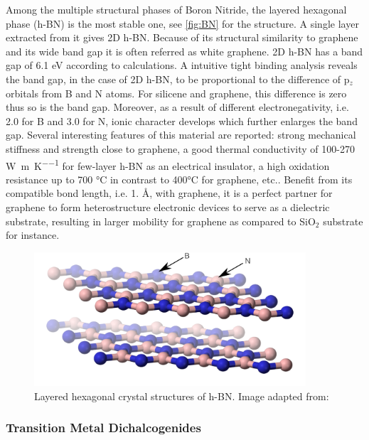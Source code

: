 Among the multiple structural phases of Boron Nitride, the layered hexagonal phase (h-BN) is the most stable one, see \autoref{fig:BN} for the structure. A single layer extracted from it gives 2D h-BN. Because of its structural similarity to graphene and its wide band gap it is often referred as white graphene\cite{alem2009atomically}. 2D h-BN has a band gap of 6.1 eV according to calculations. A intuitive tight binding analysis reveals the band gap, in the case of 2D h-BN, to be proportional to the difference of p$_z$ orbitals from B and N atoms. For silicene and graphene, this difference is zero thus so is the band gap. Moreover, as a result of different electronegativity, i.e. 2.0 for B and 3.0 for N, ionic character develops which further enlarges the band gap\cite{zhuang2012}. Several interesting features of this material are reported: strong mechanical stiffness and strength close to graphene\cite{Bosak2006}, a good thermal conductivity of 100-270 \si{\watt\per\meter\per\kelvin} for few-layer h-BN\cite{Jo2013} as an electrical insulator, a high oxidation resistance up to 700 \si{\celsius} in contrast to 400\si{\celsius} for graphene\cite{li2016atomically}, etc.. Benefit from its compatible bond length, i.e. 1. \AA, with graphene, it is a perfect partner for graphene to form heterostructure electronic devices to serve as a dielectric substrate\cite{Lee2013}, resulting in larger mobility for graphene as compared to SiO$_2$ substrate\cite{dean2010boron} for instance. 


\begin{figure}[htbp!] 
\centering  
\includegraphics[width=0.9\textwidth]{BN.png}
\caption{Layered hexagonal crystal structures of h-BN. Image adapted from:\cite{Benjah2007}}  
\label{fig:BN}
\end{figure} 


\subsubsection{Transition Metal Dichalcogenides}

